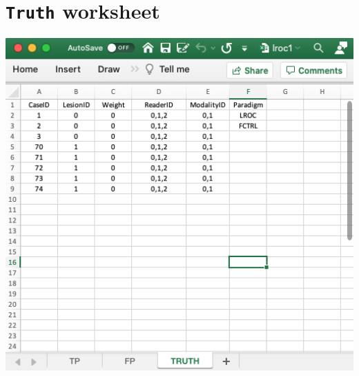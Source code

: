 \documentclass[
]{book}
\begin{document}
\hypertarget{quick-start-lroc-truth}{%
\section{\texorpdfstring{\texttt{Truth} worksheet}{Truth worksheet}}\label{quick-start-lroc-truth}}

\includegraphics[width=1\textwidth,height=\textheight]{images/quick-start/lroc1Truth.png}
\end{document}
